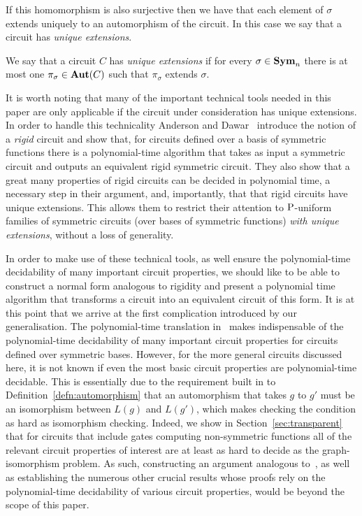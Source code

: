 \documentclass[../paper.tex]{subfiles}
\begin{document}
If this homomorphism is also surjective then we have that each element of
$\sigma$ extends uniquely to an automorphism of the circuit. In this case we say
that a circuit has \emph{unique extensions}.

\begin{definition}
  We say that a circuit $C$ has \emph{unique extensions} if for every $\sigma
  \in \text{\textbf{Sym}}_n$ there is at most one $\pi_{\sigma} \in \text{\textbf{Aut}}(C)$ such that
  $\pi_{\sigma}$ extends $\sigma$.
\end{definition}

It is worth noting that many of the important technical tools needed in this
paper are only applicable if the circuit under consideration has unique
extensions. In order to handle this technicality Anderson and
Dawar~\cite{AndersonD17} introduce the notion of a \emph{rigid} circuit and show
that, for circuits defined over a basis of symmetric functions there is a
polynomial-time algorithm that takes as input a symmetric circuit and outputs an
equivalent rigid symmetric circuit. They also show that a great many properties
of rigid circuits can be decided in polynomial time, a necessary step in their
argument, and, importantly, that that rigid circuits have unique extensions.
This allows them to restrict their attention to $\mathrm{P}$-uniform families of
symmetric circuits (over bases of symmetric functions) \emph{with unique
  extensions}, without a loss of generality.

In order to make use of these technical tools, as well ensure the
polynomial-time decidability of many important circuit properties, we should
like to be able to construct a normal form analogous to rigidity and present a
polynomial time algorithm that transforms a circuit into an equivalent circuit
of this form. It is at this point that we arrive at the first complication
introduced by our generalisation. The polynomial-time translation
in~\cite{AndersonD17} makes indispensable of the polynomial-time decidability of
many important circuit properties for circuits defined over symmetric bases.
However, for the more general circuits discussed here, it is not known if even
the most basic circuit properties are polynomial-time decidable. This is
essentially due to the requirement built in to
Definition~\ref{defn:automorphism} that an automorphism that takes $g$ to $g'$
must be an isomorphism between $L(g)$ and $L(g')$, which makes checking the
condition as hard as isomorphism checking. Indeed, we show in
Section~\ref{sec:transparent} that for circuits that include gates computing
non-symmetric functions all of the relevant circuit properties of interest are
at least as hard to decide as the graph-isomorphism problem. As such,
constructing an argument analogous to~\cite{AndersonD17}, as well as
establishing the numerous other crucial results whose proofs rely on the
polynomial-time decidability of various circuit properties, would be beyond the
scope of this paper.
\end{document}
